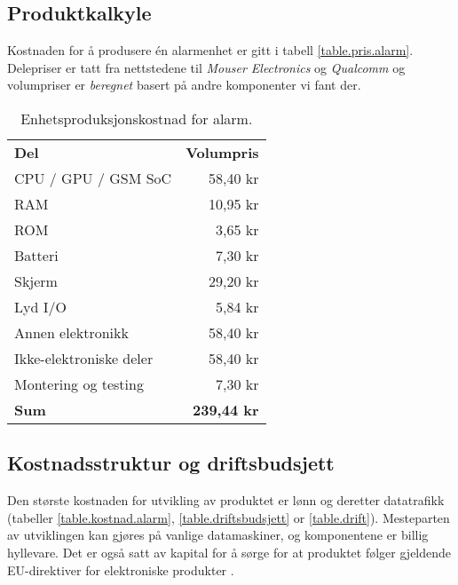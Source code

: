 \subsection{Produktkalkyle}

Kostnaden for å produsere én alarmenhet er gitt i tabell
\vref{table.pris.alarm}.  Delepriser er tatt fra nettstedene til \textit{Mouser
Electronics} og \textit{Qualcomm} og volumpriser er \textit{beregnet} basert på
andre komponenter vi fant der.

\begin{table}
  \centering
  \begin{tabular}{lr}
    \textbf{Del} & \textbf{Volumpris} \\
    CPU / GPU / GSM SoC & 58,40 kr \\
    RAM       & 10,95 kr \\
    ROM       &  3,65 kr \\
    Batteri   &  7,30 kr \\
    Skjerm    & 29,20 kr \\
    Lyd I/O   &  5,84 kr \\
    Annen elektronikk & 58,40 kr \\
    Ikke-elektroniske deler & 58,40 kr \\
    Montering og testing & 7,30 kr \\
    \textbf{Sum} & \textbf{239,44 kr} \\
  \end{tabular}
  \caption{Enhetsproduksjonskostnad for alarm.}
  \label{table.pris.alarm}
\end{table}

\subsection{Kostnadsstruktur og driftsbudsjett}


Den største kostnaden for utvikling av produktet er lønn og deretter
datatrafikk (tabeller \ref{table.kostnad.alarm}, \ref{table.driftsbudsjett} or
\ref{table.drift}).  Mesteparten av utviklingen kan gjøres på vanlige
datamaskiner, og komponentene er billig hyllevare. Det er også satt av kapital
for å sørge for at produktet følger gjeldende EU-direktiver for elektroniske
produkter \cite{dir.rohs, dir.2001.95}.


